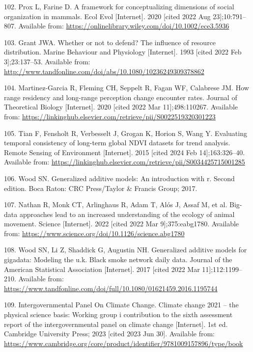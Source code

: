 \documentclass[
  12pt,
]{article}
\newlength{\cslhangindent}
\newenvironment{CSLReferences}[2] %
 {\begin{list}{}{%
  \setlength{\itemindent}{0pt}
  \setlength{\leftmargin}{0pt}
  \setlength{\parsep}{0pt}
  \ifodd #1
   \setlength{\leftmargin}{\cslhangindent}
   \setlength{\itemindent}{-1\cslhangindent}
  \fi
  \setlength{\itemsep}{#2\baselineskip}}}
 {\end{list}}
\begin{document}
\begin{CSLReferences}{0}{1}
102. Prox L, Farine D. A framework for conceptualizing dimensions of social organization in mammals. Ecol Evol {[}Internet{]}. 2020 {[}cited 2022 Aug 23{]};10:791--807. Available from: \url{https://onlinelibrary.wiley.com/doi/10.1002/ece3.5936}

103. Grant JWA. Whether or not to defend? The influence of resource distribution. Marine Behaviour and Physiology {[}Internet{]}. 1993 {[}cited 2022 Feb 3{]};23:137--53. Available from: \url{http://www.tandfonline.com/doi/abs/10.1080/10236249309378862}

104. Martinez-Garcia R, Fleming CH, Seppelt R, Fagan WF, Calabrese JM. How range residency and long-range perception change encounter rates. Journal of Theoretical Biology {[}Internet{]}. 2020 {[}cited 2022 Mar 11{]};498:110267. Available from: \url{https://linkinghub.elsevier.com/retrieve/pii/S0022519320301223}

105. Tian F, Fensholt R, Verbesselt J, Grogan K, Horion S, Wang Y. Evaluating temporal consistency of long-term global {NDVI} datasets for trend analysis. Remote Sensing of Environment {[}Internet{]}. 2015 {[}cited 2024 Feb 14{]};163:326--40. Available from: \url{https://linkinghub.elsevier.com/retrieve/pii/S0034425715001285}

106. Wood SN. Generalized additive models: An introduction with r. Second edition. Boca Raton: {CRC} Press/Taylor \& Francis Group; 2017.

107. Nathan R, Monk CT, Arlinghaus R, Adam T, Alós J, Assaf M, et al. Big-data approaches lead to an increased understanding of the ecology of animal movement. Science {[}Internet{]}. 2022 {[}cited 2022 Mar 9{]};375:eabg1780. Available from: \url{https://www.science.org/doi/10.1126/science.abg1780}

108. Wood SN, Li Z, Shaddick G, Augustin NH. Generalized additive models for gigadata: Modeling the u.k. Black smoke network daily data. Journal of the American Statistical Association {[}Internet{]}. 2017 {[}cited 2022 Mar 11{]};112:1199--210. Available from: \url{https://www.tandfonline.com/doi/full/10.1080/01621459.2016.1195744}

109. Intergovernmental Panel On Climate Change. Climate change 2021 -- the physical science basis: Working group i contribution to the sixth assessment report of the intergovernmental panel on climate change {[}Internet{]}. 1st ed. Cambridge University Press; 2023 {[}cited 2023 Jun 30{]}. Available from: \url{https://www.cambridge.org/core/product/identifier/9781009157896/type/book}


\end{CSLReferences}
\end{document}
